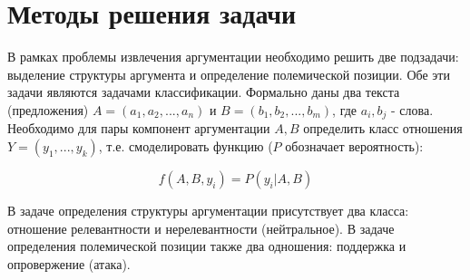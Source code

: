 \section{Методы решения задачи}

В рамках проблемы извлечения аргументации необходимо решить две подзадачи: выделение структуры аргумента и определение полемической позиции. Обе эти задачи являются задачами классификации. Формально даны два текста (предложения) $A = (a_1, a_2, ..., a_n)$ и $B = (b_1, b_2, ..., b_m)$, где $a_i, b_j$ - слова. Необходимо для пары компонент аргументации $A,B$ определить класс отношения $Y = (y_1, ..., y_k)$, т.е. смоделировать функцию ($P$ обозначает вероятность):

\begin{equation*}
    f(A, B, y_i) = P(y_i| A, B)
\end{equation*}

В задаче определения структуры аргументации присутствует два класса: отношение релевантности и нерелевантности (нейтральное). В задаче определения полемической позиции также два одношения: поддержка и опровержение (атака).

